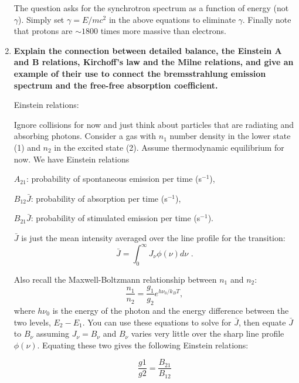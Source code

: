 \begin{enumerate}
      The question asks for the synchrotron spectrum as a function of energy (not $\gamma$).
      Simply set $\gamma = E/mc^2$ in the above equations to eliminate $\gamma$.  Finally note
      that protons are $\sim 1800$ times more massive than electrons.

\item \textbf{Explain the connection between detailed balance, the Einstein A and B relations,
      Kirchoff's law and the Milne relations, and give an example of their use to connect the
      bremsstrahlung emission spectrum and the free-free absorption coefficient.}
      
      Einstein relations:
      
      Ignore collisions for now and just think about particles that are radiating and absorbing photons. Consider a gas with $n_1$ number density in the lower state (1) and $n_2$ in the excited state (2). Assume thermodynamic equilibrium for now. We have Einstein relations
      
      $A_{21}$: probability of spontaneous emission per time (s$^{-1}$),
      
      $B_{12}\bar{J}$: probability of absorption per time (s$^{-1}$),
      
       $B_{21}\bar{J}$: probability of stimulated emission per time (s$^{-1}$).
       
       $\bar{J}$ is just the mean intensity averaged over the line profile for the transition:
       \begin{equation}
       \bar{J} = \int^\infty_0 J_\nu \phi(\nu) d\nu \,\,.
       \end{equation}
       
       Also recall the Maxwell-Boltzmann relationship between $n_1$ and $n_2$:
       \begin{equation}
       \frac{n_1}{n_2} = \frac{g_1}{g_2} e^{h\nu_0 / k_B T},
       \end{equation}
       where $h\nu_0$ is the energy of the photon and the energy difference between the two levels, $E_2 - E_1$. You can use these equations to solve for $\bar{J}$, then equate $\bar{J}$ to $B_\nu$ assuming $J_\nu = B_\nu$ and $B_\nu$ varies very little over the sharp line profile $\phi(\nu)$. Equating these two gives the following Einstein relations:
      
      \begin{equation}
      \frac{g1}{g2} = \frac{B_{21}}{B_{12}}
      \end{equation}
      

\end{enumerate}
